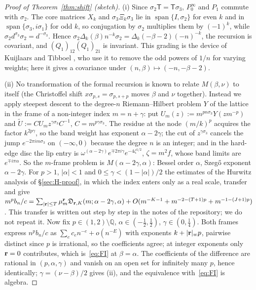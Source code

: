 \begin{proof}[Proof of Theorem~\ref{thm:shift} (sketch)]
(i) Since $\sigma_2\mathsf T=\mathsf T\sigma_3$, $P_0^\infty$ and $P_1$ commute with $\sigma_2$. The core matrices $X_k$ and $\sigma_3\Xi_k\sigma_3$ lie in
$\operatorname{span}\{I,\sigma_2\}$ for even $k$ and in $\operatorname{span}\{\sigma_3,i\sigma_1\}$ for odd $k$, so conjugation by $\sigma_2$
multiplies them by $(-1)^k$, while $\sigma_2d^{\sigma_3}\sigma_2=d^{-\sigma_3}$. Hence $\sigma_2\Delta_k(\beta)n^{-k}\sigma_2=\Delta_k(-\beta-2)(-n)^{-k}$, the
recursion is covariant, and $(Q_1)_{12}(Q_1)_{21}$ is invariant. This grading is the device of Kuijlaars and Tibboel
\cite[Lemma~4.1]{KuijlaarsTibboel}, who use it to remove the odd powers of $1/n$ for varying weights; here it gives a covariance under
$(n,\beta)\mapsto(-n,-\beta-2)$.

(ii) No transformation of the formal recursion is known to relate $M(\beta,\nu)$ to itself (the Christoffel shift $x\sigma_{p,s}=\sigma_{p,s+p}$
moves $\beta$ and $\nu$ together). Instead we apply steepest descent to the degree-$n$ Riemann--Hilbert problem $Y$ of the lattice in the frame of a
non-integer index $m=n+\gamma$: put $U_m(z):=m^{pn\sigma_3}Y(zm^{-p})$ and $\tilde U:=CU_mz^{\gamma\sigma_3}C^{-1}$, $C=m^{p\gamma\sigma_3}$. The
residue at the node $(m/k)^p$ acquires the factor $k^{2p\gamma}$, so the band weight has exponent $\alpha-2\gamma$; the cut of $z^{\gamma\sigma_3}$
cancels the jump $e^{-2\pi im\sigma_3}$ on $(-\infty,0)$ because the degree $n$ is an integer; and in the hard-edge disc the lip entry is
$\omega^{(\alpha-2\gamma)}e^{\mp2\pi i\gamma}e^{-4\zeta^{1/2}}$, $\zeta=m^2f$, whose band limits are $e^{\mp i\pi\alpha}$. So the $m$-frame problem
is $M(\alpha-2\gamma,\alpha)$: Bessel order $\alpha$, Szeg\H{o} exponent $\alpha-2\gamma$. For $p>1$, $|\alpha|<1$ and $0\le\gamma<(1-|\alpha|)/2$ the
estimates of the Hurwitz analysis of \S\ref{sec:H-proof}, in which the index enters only as a real scale, transfer and give
$m^pb_n/c=\sum_{|\mathbf r|\le T}\mu_m^{\mathbf r}\mathfrak D_{\mathbf r,K}(m;\alpha-2\gamma,\alpha)+O(m^{-K-1}+m^{-2-(T+1)p}+m^{-1-(J+1)p})$. This transfer is written
out step by step in the notes of the repository; we do not repeat it. Now fix $p\in(1,2)\setminus\mathbb Q$, $\alpha\in(-\frac12,\frac12)$,
$\gamma\in(0,\frac14)$. Both frames express $n^pb_n/c$ as $\sum_ec_en^{-e}+o(n^{-E})$ with exponents $k+|\mathbf r|_wp$, pairwise distinct since $p$ is
irrational, so the coefficients agree; at integer exponents only $\mathbf r=0$ contributes, which is~\eqref{eq:FI} at $\beta=\alpha$. The coefficients of
the difference are rational in $(p,\alpha,\gamma)$ and vanish on an open set for infinitely many $p$, hence identically;
$\gamma=(\nu-\beta)/2$ gives (ii), and the equivalence with~\eqref{eq:FI} is algebra.


\end{proof}
